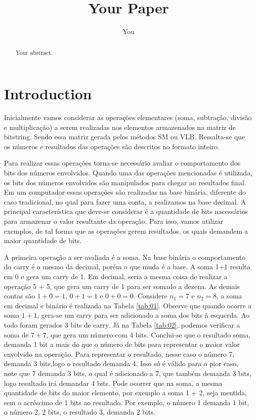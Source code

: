 \documentclass[12pt]{article}
\title{Your Paper}
\author{You}
\begin{document}
\maketitle

\begin{abstract}
Your abstract.
\end{abstract}

\section{Introduction}

Inicialmente vamos considerar as operações elementares (soma, subtração, divisão
e multiplicação) a serem realizadas nos elementos armazenados na matriz de
bitstring. Sendo essa matriz gerada pelos métodos SM ou VLB. Ressalta-se que os
números e resultados das operações são descritos no formato inteiro.

Para realizar essas operações torna-se necessário avaliar o comportamento dos
bits dos números envolvidos. Quando uma das operações mencionadas é utilizada,
os bits dos números envolvidos são manipulados para chegar ao resultados final.
Em um computador essas operações são realizadas na base binária, diferente do
caso tradicional, no qual para fazer uma conta, a realizamos na base decimal. A
principal característica que deve-se considerar é a quantidade de bits
nacessários para armazenar o valor resultante da operação. Para isso, vamos
utilizar exemplos, de tal forma que as operações gerem resultados, os quais
demandem a maior quantidade de bits.

A primeira operação a ser avaliada é a soma. Na base binária o comportamento do
carry é o mesmo da decimal, porém o que muda é a base. A soma 1+1 resulta em 0 e
gera um carry de 1. Em decimal, seria a mesma coisa de realizar a operação 5 +
5, que gera um carry de 1 para ser somado a dezena.  As demais contas são $1 + 0
= 1$, $0 + 1 = 1$ e $0 + 0 = 0$. Considere $n_1=7$ e $n_2=8$, a soma em decimal
e binário é realizada na Tabela \ref{tab:01}. Observe que quando ocorre a soma
$1 + 1$, gera-se um carry para ser adicionado a soma dos bits à esquerda. Ao
todo foram gerados 3 bits de carry. Já na Tabela \ref{tab:02}, podemos verificar
a soma de $7 + 7$, que gera um número com 4 bits. Conclui-se que o resultado
soma, demanda 1 bit a mais do que o número de bits para representar o maior
valor envolvido na operação. Para representar o resultado, nesse caso o número
7, demanda 3 bits,logo o resultado demanda 4. Isso só é válido para o pior caso,
note que 7 demanda 3 bits, o qual é adicionado a 7, que também demanda 3 
bits, logo resultado irá demandar 4 bits. Pode ocorrer que na soma, a mesma
quantidade de bits do maior elemento, por exemplo a soma 1 + 2, seja mentida,
sem o acréscimo de 1 bits ao resultado. Por exemplo, o número 1 demanda 1 bit, o
número 2, 2 bits, o resultado 3, demanda 2 bits.
\end{document}
